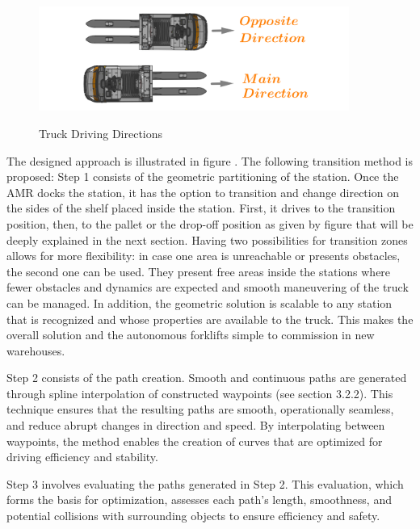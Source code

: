 \begin{figure}
    [!ht]
    \begin{center}
    \includegraphics[width=4in]{images/Chap2/driving_directions.png}\\
    \caption{Truck Driving Directions}
    \label{driving directions}
    \end{center}
\end{figure} 
 
The designed approach is illustrated in figure .
The following transition method is proposed: Step 1 consists of the geometric partitioning of the station.
Once the AMR docks the station, it has the option to transition and change 
direction on the sides of the shelf placed inside the station. First, it drives to the transition position, then, to the 
pallet or the drop-off position as given by figure  that will be deeply explained in the next section. 
Having two possibilities for transition zones allows 
for more flexibility: 
in case one area is unreachable or presents obstacles, the second one can be used. They present free areas 
inside the stations where fewer obstacles and dynamics are expected and smooth maneuvering of the truck can be managed. 
In addition, the geometric solution is scalable to 
any station that is recognized and whose properties are available to the truck. This makes the overall solution and the 
autonomous forklifts simple to
commission in new warehouses.

Step 2 consists of the path creation. Smooth and continuous paths are generated through spline interpolation of constructed 
waypoints (see section 3.2.2). 
This technique ensures 
that the resulting paths are smooth, operationally seamless, and reduce abrupt changes in direction and speed. 
By interpolating between waypoints, the method enables the creation of curves that are optimized for driving efficiency 
and stability.

Step 3 involves evaluating the paths generated in Step 2. This evaluation, which forms the basis for optimization, 
assesses each path's length, smoothness, and potential collisions with surrounding objects to ensure efficiency 
and safety.

